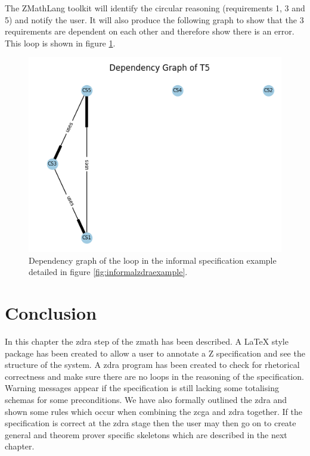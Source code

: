 The ZMathLang toolkit will identify the circular reasoning (requirements 1, 3 and 5) and notify the
user. 
It will also produce the following graph to show that the 3 requirements are
dependent on each other and therefore show there is an error. This loop is shown
in figure \ref{fig:informalloop}.

\begin{figure}[H]
    \includegraphics[width=12cm]{informal/dep.png}
    \caption{Dependency graph of the loop in the informal specification example detailed in figure \ref{fig:informalzdraexample}. \label{fig:informalloop}}
\end{figure}


\section{Conclusion}
In this chapter the \gls{zdra} step of the \gls{zmath} has been described. A
\LaTeX{} style package has been created to allow a user to annotate a Z
specification and see the structure of the system. A \gls{zdra} program has been
created to check for rhetorical correctness and make sure there are no loops in
the reasoning of the specification. Warning messages appear if the specification
is still lacking some totalising schemas for some preconditions. We have also
formally outlined the \gls{zdra} and shown some rules which occur when combining
the \gls{zcga} and \gls{zdra} together. If the specification is correct at the
\gls{zdra} stage then the user may then go on to create general and theorem
prover specific skeletons which are described in the next chapter.